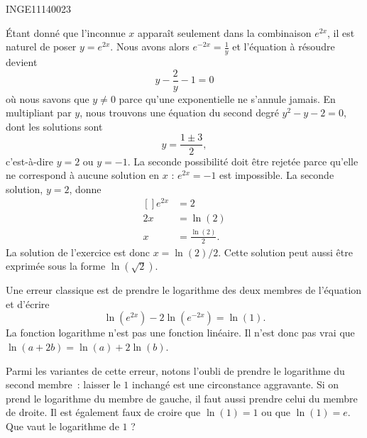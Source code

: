 

\begin{corrige}{INGE11140023}

	Étant donné que l'inconnue $x$ apparaît seulement dans la combinaison $e^{2x}$, il est naturel de poser $y= e^{2x}$. Nous avons alors $ e^{-2x}=\frac{1}{ y }$ et l'équation à résoudre devient
	\begin{equation}
		y-\frac{ 2 }{ y }-1=0
	\end{equation}
	où nous savons que $y\neq 0$ parce qu'une exponentielle ne s'annule jamais. En multipliant par $y$, nous trouvons une équation du second degré $y^2-y-2=0$, dont les solutions sont
	\begin{equation}
		y=\frac{ 1\pm 3 }{2},
	\end{equation}
	c'est-à-dire $y=2$ ou $y=-1$. La seconde possibilité doit être rejetée parce qu'elle ne correspond à aucune solution en $x$ : $ e^{2x}=-1$ est impossible. La seconde solution, $y=2$, donne
	\begin{equation}
		\begin{aligned}[]
			e^{2x}&=2\\
			2x&=\ln(2)\\
			x&=\frac{ \ln(2) }{ 2 }.
		\end{aligned}
	\end{equation}
	La solution de l'exercice est donc $x=\ln(2)/2$. Cette solution peut aussi être exprimée sous la forme $\ln(\sqrt{2})$.

	\begin{remark}
		Une erreur classique est de prendre le logarithme des deux membres de l'équation et d'écrire
		\begin{equation}
			\ln( e^{2x})-2\ln( e^{-2x})=\ln(1).
		\end{equation}
		La fonction logarithme n'est pas une fonction linéaire. Il n'est donc pas vrai que $\ln(a+2b)=\ln(a)+2\ln(b)$.

		Parmi les variantes de cette erreur, notons l'oubli de prendre le logarithme du second membre~: laisser le $1$ inchangé est une circonstance aggravante. Si on prend le logarithme du membre de gauche, il faut aussi prendre celui du membre de droite. Il est également faux de croire que $\ln(1)=1$ ou que $\ln(1)=e$. Que vaut le logarithme de $1$ ?
	\end{remark}
	

\end{corrige}
